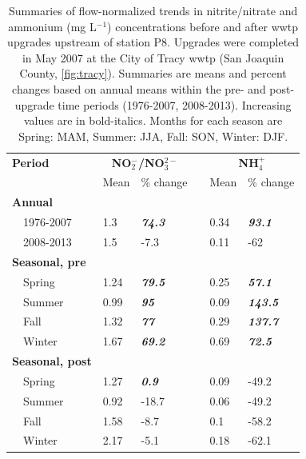 \documentclass[letterpaper,12pt,oneside]{article}\usepackage[]{graphicx}\usepackage[]{color}
\begin{document}
\begin{table}[!tbp]
\caption{Summaries of flow-normalized trends in nitrite/nitrate and ammonium (mg L$^{-1}$) concentrations before and after \ac{wwtp} upgrades upstream of station P8. Upgrades were completed in May 2007 at the City of Tracy \ac{wwtp} (San Joaquin County, \cref{fig:tracy}).  Summaries are means and percent changes based on annual means within the pre- and post-upgrade time periods (1976-2007, 2008-2013).  Increasing values are in bold-italics. Months for each season are Spring: MAM, Summer: JJA, Fall: SON, Winter: DJF.\label{tab:p8chg}} 
\begin{center}
\begin{tabular}{lllcll}
\hline\hline
\multicolumn{1}{l}{\bfseries Period}&\multicolumn{2}{c}{\bfseries NO$_{2}^{-}$/NO$_{3}^{2-}$}&\multicolumn{1}{c}{\bfseries }&\multicolumn{2}{c}{\bfseries NH$_{4}^{+}$}\tabularnewline
\cline{2-3} \cline{5-6}
\multicolumn{1}{l}{}&\multicolumn{1}{c}{Mean}&\multicolumn{1}{c}{\% change}&\multicolumn{1}{c}{}&\multicolumn{1}{c}{Mean}&\multicolumn{1}{c}{\% change}\tabularnewline
\hline
{\bfseries Annual}&&&&&\tabularnewline
~~1976-2007&1.3&\textit{\textbf{74.3}}&&0.34&\textit{\textbf{93.1}}\tabularnewline
~~2008-2013&1.5&-7.3&&0.11&-62\tabularnewline
\hline
{\bfseries Seasonal, pre}&&&&&\tabularnewline
~~Spring&1.24&\textit{\textbf{79.5}}&&0.25&\textit{\textbf{57.1}}\tabularnewline
~~Summer&0.99&\textit{\textbf{95}}&&0.09&\textit{\textbf{143.5}}\tabularnewline
~~Fall&1.32&\textit{\textbf{77}}&&0.29&\textit{\textbf{137.7}}\tabularnewline
~~Winter&1.67&\textit{\textbf{69.2}}&&0.69&\textit{\textbf{72.5}}\tabularnewline
\hline
{\bfseries Seasonal, post}&&&&&\tabularnewline
~~Spring&1.27&\textit{\textbf{0.9}}&&0.09&-49.2\tabularnewline
~~Summer&0.92&-18.7&&0.06&-49.2\tabularnewline
~~Fall&1.58&-8.7&&0.1&-58.2\tabularnewline
~~Winter&2.17&-5.1&&0.18&-62.1\tabularnewline
\hline
\end{tabular}\end{center}

\end{table}
\end{document}
